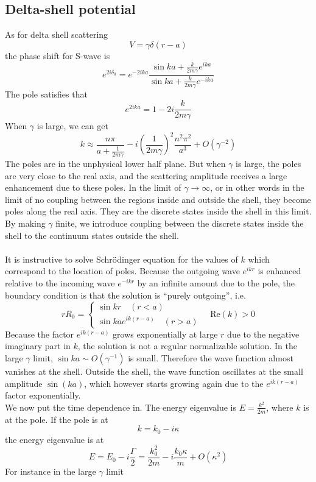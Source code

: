 \subsection{Delta-shell potential}
As for delta shell scattering
\[V = \gamma\delta(r-a)\]
the phase shift for S-wave is
\[e^{2i\delta_0} = e^{-2ika}\frac{\sin ka + \frac{k}{2m\gamma}e^{ika}}{\sin ka + \frac{k}{2m\gamma}e^{-ika}}\]
The pole satisfies that
\[e^{2ika} = 1 - 2i\frac{k}{2m\gamma}\]
When $\gamma$ is large, we can get
\[k \approx \frac{n\pi}{a + \frac{1}{2m\gamma}} -i \left(\frac{1}{2m\gamma} \right)^2 \frac{n^2\pi^2}{a^3} + O(\gamma^{-2})\]
The poles are in the unphysical lower half plane. But when $\gamma$ is large, the poles are very close to the real axis, and the scattering amplitude receives a large enhancement due to these poles. 
In the limit of $\gamma \to \infty$, or in other words in the limit of no coupling between the regions inside and outside the shell, they become poles along the real axis. 
They are the discrete states inside the shell in this limit. 
By making $\gamma$ finite, we introduce coupling between the discrete states inside the shell to the continuum states outside the shell.
\\ \\
It is instructive to solve Schrödinger equation for the values of $k$ which correspond to the location of poles. Because the outgoing wave $e^{ikr}$ is enhanced relative to the incoming wave $e^{-ikr}$ by an infinite amount due to the pole, the boundary condition is that the solution is ``purely outgoing'', i.e.
\[rR_0 = \begin{cases} \sin kr \quad (r<a) \\ \sin ka e^{ik(r-a)} \quad (r>a)  \end{cases} \quad \mathrm{Re}(k) > 0\]
Because the factor $e^{ik(r-a)}$ grows exponentially at large $r$ due to the negative imaginary part in $k$, the solution is not a regular normalizable solution.
In the large $\gamma$ limit, $\sin ka \sim O(\gamma^{-1})$ is small. Therefore the wave function almost vanishes at the shell.
Outside the shell, the wave function oscillates at the small amplitude $\sin(ka)$, which however starts growing again due to the $e^{ik(r-a)}$ factor exponentially.
\\
We now put the time dependence in. The energy eigenvalue
is $E = \frac{k^2}{2m}$, where $k$ is at the pole. If the pole is at
\[k = k_0 - i\kappa\]
the energy eigenvalue is at
\[E = E_0 - i\frac{\Gamma}{2} = \frac{k_0^2}{2m} - i \frac{k_0\kappa}{m} + O(\kappa^2)\]
For instance in the large $\gamma$ limit
